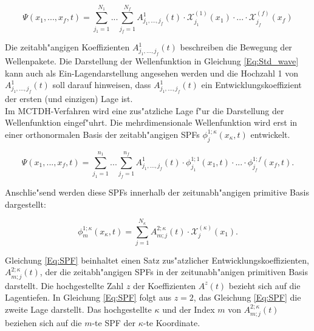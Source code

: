  \begin{equation}
 \Psi(x_{1},..., x_{f}, t)=\sum^{N_{1}}_{j_{1}=1} ... \sum^{N_{f}}_{j_{f}=1} A^{1}_{j_{1}, ..., j_{f}}(t)\cdot \mathcal{X}^{(1)}_{j_{1}}(x_{1}) \cdot ... \cdot \mathcal{X}^{(f)}_{j_{f}}(x_{f})
 \label{Eq:Std_wave}
 \end{equation}

Die zeitabh"angigen Koeffizienten $A^{1}_{j_{1}, ..., j_{f}}(t)$ beschreiben die Bewegung der Wellenpakete.
Die Darstellung der Wellenfunktion in Gleichung  \ref{Eq:Std_wave} kann auch als Ein-Lagendarstellung angesehen werden
und die Hochzahl 1 von $A^{1}_{j_{1}, ..., j_{f}}(t)$ soll darauf hinweisen, dass $A^{1}_{j_{1}, ..., j_{f}}(t)$ ein Entwicklungskoeffizient
der ersten (und einzigen) Lage ist.
\\Im MCTDH-Verfahren wird eine zus"atzliche Lage f"ur die Darstellung der Wellenfunktion eingef"uhrt.
Die mehrdimensionale Wellenfunktion wird erst in einer orthonormalen Basis der zeitabh"angigen SPFs $\phi^{1;\kappa}_{j}(x_{\kappa},t)$
entwickelt.


 \begin{equation}
 \Psi(x_{1},..., x_{f}, t)=\sum^{n_{1}}_{j_{1}=1} ... \sum^{n_{f}}_{j_{f}=1} A^{1}_{j_{1}, ..., j_{f}}(t)
 \cdot \phi^{1;1}_{j_{1}}(x_{1}, t) \cdot ... \cdot \phi^{1;f}_{j_{f}}(x_{f}, t).
 \label{Eq:mctdh_wave}
 \end{equation}

Anschlie"send werden diese SPFs innerhalb der zeitunabh"angigen primitive Basis dargestellt: 

\begin{equation}
 \phi^{1;\kappa}_{m} (x_{\kappa}, t)=\sum^{N_{\kappa}}_{j=1} A^{2;\kappa}_{m;j}(t) \cdot \mathcal{X}^{(\kappa)}_{j}(x_{1}).
 \label{Eq:SPF}
 \end{equation}

Gleichung \ref{Eq:SPF} beinhaltet einen Satz zus"atzlicher Entwicklungskoeffizienten, $ A^{2;\kappa}_{m;j}(t) $, der die zeitabh"angigen SPFs
in der zeitunabh"anigen primitiven Basis darstellt.
Die hochgestellte Zahl $z$ der Koeffizienten $A^{z}(t)$ bezieht sich auf die Lagentiefen.
In Glei\-chung \ref{Eq:SPF} folgt aus $z=2$, das Gleichung \ref{Eq:SPF} die zweite Lage darstellt.
Das hochgestellte $\kappa$ und der Index $m$ von $A^{2;\kappa}_{m;j}(t)$ beziehen sich auf die $m$-te SPF der $\kappa$-te Koordinate.

